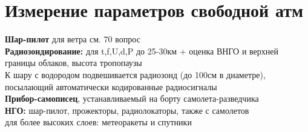 
\section{Измерение параметров свободной атм}
\textbf{Шар-пилот} для ветра см. 70 вопрос\\
\textbf{Радиозондирование:} для t,f,U,d,P до 25-30км + оценка ВНГО и верхней границы облаков, высота тропопаузы\\
К шару с водородом подвешивается радиозонд (до 100см в диаметре), посылающий автоматически кодированные радиосигналы\\
\textbf{Прибор-самописец}, устанавливаемый на борту самолета-разведчика\\
\textbf{НГО:} шар-пилот, прожекторы, радиолокаторы, также с самолетов\\
для более высоких слоев: метеоракеты и спутники


